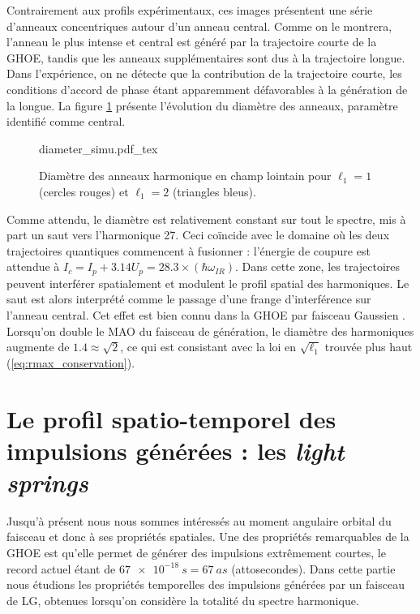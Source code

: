 Contrairement aux profils expérimentaux, ces images présentent une série d'anneaux concentriques autour d'un anneau central. Comme on le montrera, l'anneau le plus intense et central est généré par la trajectoire courte de la GHOE, tandis que les anneaux supplémentaires sont dus à la trajectoire longue. Dans l'expérience, on ne détecte que la contribution de la trajectoire courte, les conditions d'accord de phase étant apparemment défavorables à la génération de la longue. La figure \ref{Fig:DiamSimu} présente l'évolution du diamètre des anneaux, paramètre identifié comme central.

\begin{figure}[!ht]
\centering
\def\svgwidth{.9\columnwidth}
{diameter_simu.pdf_tex}
\caption{Diamètre des anneaux harmonique en champ lointain pour $\ell_1=1$ (cercles rouges) et $\ell_1=2$ (triangles bleus).}
\label{Fig:DiamSimu}
\end{figure}

Comme attendu, le diamètre est relativement constant sur tout le spectre, mis à part un saut vers l'harmonique 27. Ceci coïncide avec le domaine où les deux trajectoires quantiques commencent à fusionner : l'énergie de coupure est attendue à $I_c=I_p+3.14U_p=28.3\times(\hbar\omega_{IR})$. Dans cette zone, les trajectoires peuvent interférer spatialement et modulent le profil spatial des harmoniques. Le saut est alors interprété comme le passage d'une frange d'interférence sur l'anneau central. Cet effet est bien connu dans la GHOE par faisceau Gaussien .
\newpage
Lorsqu'on double le MAO du faisceau de génération, le diamètre des harmoniques augmente de $1.4\approx\sqrt{2}$, ce qui est consistant avec la loi en $\sqrt{\ell_1}$ trouvée plus haut (\ref{eq:rmax_conservation}). 

\chapter{Le profil spatio-temporel des impulsions générées : les \textit{light springs}}
Jusqu'à présent nous nous sommes intéressés au moment angulaire orbital du faisceau et donc à ses propriétés spatiales. Une des propriétés remarquables de la GHOE est qu'elle permet de générer des impulsions extrêmement courtes, le record actuel étant de $\SI{67e-18}{s}=\SI{67}{as}$ (attosecondes). Dans cette partie nous étudions les propriétés temporelles des impulsions générées par un faisceau de LG, obtenues lorsqu'on considère la totalité du spectre harmonique.

